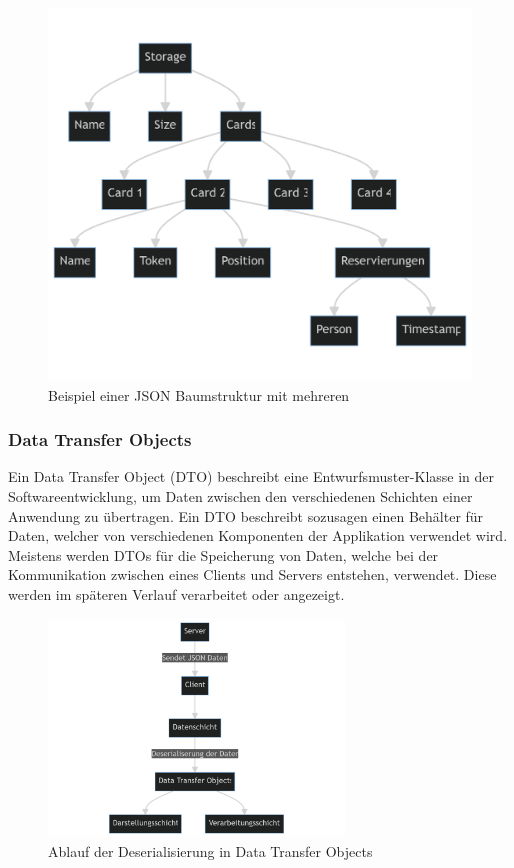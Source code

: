 \begin{figure}[h!]
\centering
\includegraphics[width=1\textwidth]{FLUTTER/images/GP/JSON-Tree-Structur.png}
\caption{Beispiel einer JSON Baumstruktur mit mehreren }
\end{figure}

\newpage

\subsubsection{Data Transfer Objects}\label{subsubsec:thero:dtos}
Ein Data Transfer Object (DTO) beschreibt eine Entwurfsmuster-Klasse in der Softwareentwicklung, um Daten zwischen den verschiedenen Schichten einer Anwendung zu übertragen. Ein DTO beschreibt sozusagen einen Behälter für Daten, welcher von verschiedenen Komponenten der Applikation verwendet wird. \\
Meistens werden DTOs für die Speicherung von Daten, welche bei der Kommunikation zwischen eines Clients und Servers entstehen, verwendet. Diese werden im späteren Verlauf verarbeitet oder angezeigt. 

\begin{figure}[h!]
\centering
\includegraphics[width=0.7\textwidth]{FLUTTER/images/GP/deserialization.png}
\caption{Ablauf der Deserialisierung in Data Transfer Objects}
\end{figure}

